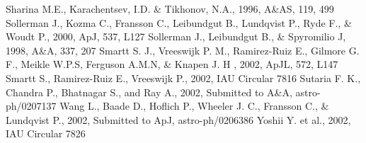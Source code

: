 \begin{thebibliography}{99}
 Sharina M.E., Karachentsev, I.D. \& Tikhonov, N.A., 1996, A\&AS, 119, 499
 Sollerman J., Kozma C., Fransson C., Leibundgut B., Lundqvist P., Ryde F., \& Woudt P., 2000, ApJ, 537, L127
 Sollerman J., Leibundgut B., \& Spyromilio J, 1998, A\&A, 337, 207
 Smartt S. J., Vreeswijk P. M., Ramirez-Ruiz E., Gilmore G. F., Meikle W.P.S, Ferguson A.M.N, \& Knapen J. H , 2002, ApJL, 572, L147 
 Smartt S., Ramirez-Ruiz E., Vreeswijk P., 2002, IAU Circular 7816
 Sutaria F. K., Chandra P., Bhatnagar S., and Ray A., 2002, Submitted to A\&A, astro-ph/0207137
 Wang L., Baade D., Hoflich P., Wheeler J. C., Fransson C., \& Lundqvist P., 2002, Submitted to ApJ, astro-ph/0206386
 Yoshii Y. et al., 2002, IAU Circular 7826 
\end{thebibliography}

\appendix


\bsp

\label{lastpage}


